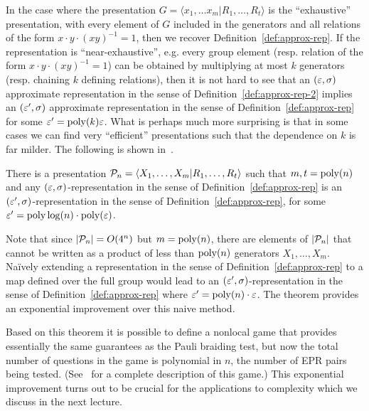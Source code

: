 In the case where the presentation $G = \langle x_1,\ldots x_m | R_1,\ldots, R_t \rangle$ is the ``exhaustive'' presentation, with every element of $G$ included in the generators and all relations of the form $x\cdot y\cdot (xy)^{-1}=1$, then we recover Definition~\ref{def:approx-rep}. If the representation is ``near-exhaustive'', e.g. every group element (resp. relation of the form $x\cdot y\cdot (xy)^{-1}=1$) can be obtained by multiplying at most $k$ generators (resp. chaining $k$ defining relations), then it is not hard to see that an $(\varepsilon,\sigma)$ approximate representation in the sense of Definition~\ref{def:approx-rep-2} implies an $(\varepsilon',\sigma)$ approximate representation in the sense of Definition~\ref{def:approx-rep} for some $\varepsilon' = \operatorname{poly}(k)\varepsilon$. What is perhaps much more surprising is that in some cases we can find very ``efficient'' presentations such that the dependence on $k$ is far milder. The following is shown in~\cite{ji2020quantum}.

\begin{theorem}
There is a presentation $\mathcal{P}_n = \langle X_1,\ldots,X_m | R_1,\ldots,R_t \rangle$ such that $m,t=\operatorname{poly}(n)$ and any $(\varepsilon,\sigma)$-representation in the sense of Definition~\ref{def:approx-rep} is an $(\varepsilon',\sigma)$-representation in the sense of Definition~\ref{def:approx-rep}, for some $\varepsilon' = \operatorname{poly}\log(n)\cdot \operatorname{poly}(\varepsilon)$. 
\end{theorem}

Note that since $|\mathcal{P}_n|=O(4^n)$ but $m=\operatorname{poly}(n)$, there are elements of $|\mathcal{P}_n|$ that cannot be written as a product of less than $\operatorname{poly}(n)$ generators $X_1,\ldots,X_m$. Na\"ively extending a representation in the sense of Definition~\ref{def:approx-rep} to a map defined over the full group would lead to an $(\varepsilon',\sigma)$-representation in the sense of Definition~\ref{def:approx-rep} where $\varepsilon' = \operatorname{poly}(n)\cdot \varepsilon$. The theorem provides an exponential improvement over this naive method. 

Based on this theorem it is possible to define a nonlocal game that provides essentially the same guarantees as the Pauli braiding test, but now the total number of questions in the game is polynomial in $n$, the number of EPR pairs being tested. (See~\cite[Section 7]{ji2021mip} for a complete description of this game.) This exponential improvement turns out to be crucial for the applications to complexity which we discuss in the next lecture. 
